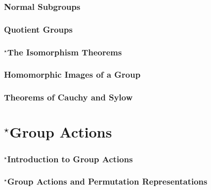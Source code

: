 \documentclass{amsbook}
\begin{document}
		\subsection{Normal Subgroups}
		\label{sub:normal_subgroups}

		\subsection{Quotient Groups}
		\label{sub:quotient_groups}

		\subsection{$^{\star}$The Isomorphism Theorems}
		\label{sub:_star_the_isomorphism_theorems}

		\subsection{Homomorphic Images of a Group}
		\label{sub:homomorphic_images_of_a_group}

		\subsection{Theorems of Cauchy and Sylow}
		\label{sub:theorems_of_cauchy_and_sylow}

	\chapter{$^{\star}$Group Actions}
	\label{sec:group_actions}
		\subsection{$^{\star}$Introduction to Group Actions}
		\label{sub:introduction_to_group_actions}

		\subsection{$^{\star}$Group Actions and Permutation Representations}
		\label{sub:group_actions_and_permutation_representations}
\end{document}
